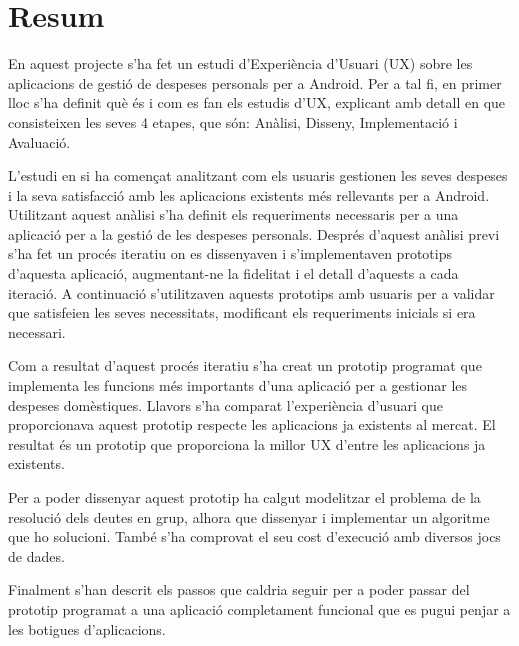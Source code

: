 \chapter*{Resum} \label{sec:Resum}

En aquest projecte s'ha fet un estudi d'Experiència d'Usuari (UX) sobre les aplicacions de gestió de despeses personals per a \gls{Android}. Per a tal fi, en primer lloc s'ha definit què és i com es fan els estudis d'UX, explicant amb detall en que consisteixen les seves 4 etapes, que són: Anàlisi, Disseny, Implementació i Avaluació.

L'estudi en si ha començat analitzant com els usuaris gestionen les seves despeses i la seva satisfacció amb les aplicacions existents més rellevants per a \gls{Android}. Utilitzant aquest anàlisi s'ha definit els requeriments necessaris per a una aplicació per a la gestió de les despeses personals. Després d'aquest anàlisi previ s'ha fet un procés iteratiu on es dissenyaven i s'implementaven prototips d'aquesta aplicació, augmentant-ne la fidelitat i el detall d'aquests a cada iteració. A continuació s'utilitzaven aquests prototips amb usuaris per a validar que satisfeien les seves necessitats, modificant els requeriments inicials si era necessari. 

Com a resultat d'aquest procés iteratiu s'ha creat un prototip programat que implementa les funcions més importants d'una aplicació per a gestionar les despeses domèstiques. Llavors s'ha comparat l'experiència d'usuari que proporcionava aquest prototip respecte les aplicacions ja existents al mercat. El resultat és un prototip que proporciona la millor UX d'entre les aplicacions ja existents.

Per a poder dissenyar aquest prototip ha calgut modelitzar el problema de la resolució dels deutes en grup, alhora que dissenyar i implementar un algoritme que ho solucioni. També s'ha comprovat el seu cost d'execució amb diversos jocs de dades. 

Finalment s'han descrit els passos que caldria seguir per a poder passar del prototip programat a una aplicació completament funcional que es pugui penjar a les botigues d'aplicacions. 


